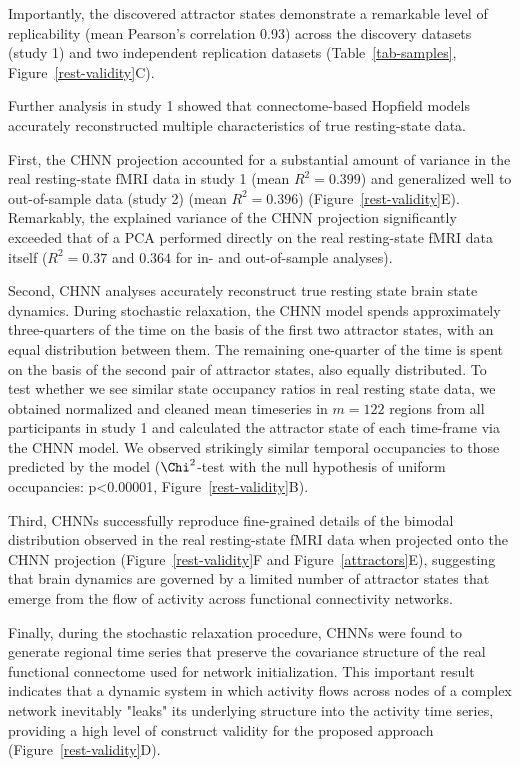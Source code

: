 \documentclass{article}
\begin{document}
Importantly, the discovered attractor states demonstrate a remarkable level of replicability (mean Pearson's
correlation 0.93) across the discovery datasets (study 1) and two independent replication datasets
(Table~\ref{tab-samples}, Figure~\ref{rest-validity}C).

Further analysis in study 1 showed that connectome-based Hopfield models accurately reconstructed multiple
characteristics of true resting-state data.

First, the CHNN projection accounted for a substantial amount of
variance in the real resting-state fMRI data in study 1 (mean $R^2=0.399$) and generalized well to out-of-sample data (study 2)
(mean $R^2=0.396$)  (Figure~\ref{rest-validity}E). Remarkably, the explained variance of the
CHNN projection significantly exceeded that of a PCA performed directly on the real resting-state fMRI data itself
($R^2=0.37$ and $0.364$ for in- and out-of-sample analyses).

Second, CHNN analyses accurately reconstruct true resting state brain state dynamics. During stochastic relaxation, the
CHNN model spends approximately three-quarters of the time on the basis of the first two attractor states, with an
equal distribution between them. The remaining one-quarter of the time is spent on the basis of the second pair of
attractor states, also equally distributed. To test whether we see similar state occupancy ratios in real resting state data,
we obtained normalized and cleaned mean timeseries in $m=122$ regions from all participants in study 1 and calculated
the attractor state of each time-frame via the CHNN model. We observed strikingly similar temporal occupancies to those
predicted by the model ($\Chi^2$-test with the null hypothesis of uniform occupancies: p\textless 0.00001,
Figure~\ref{rest-validity}B).

Third, CHNNs successfully reproduce fine-grained details of the bimodal distribution observed in the real resting-state fMRI data when projected onto the CHNN projection (Figure~\ref{rest-validity}F and Figure~\ref{attractors}E), suggesting that brain dynamics
are governed by a limited number of attractor states that emerge from the flow of activity across functional
connectivity networks.

Finally, during the stochastic relaxation procedure, CHNNs were found to generate regional time series that
preserve the covariance structure of the real functional connectome used for network initialization. This
important result indicates that a dynamic system in which activity flows across nodes of a complex network inevitably
"leaks" its underlying structure into the activity time series, providing a high level of construct validity for the
proposed approach (Figure~\ref{rest-validity}D).
\end{document}
